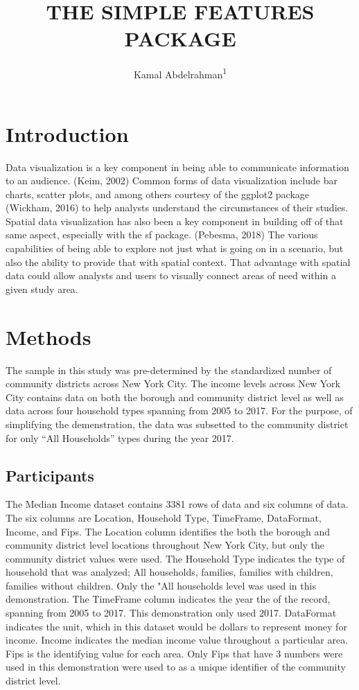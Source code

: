 \documentclass[man]{apa6}
\title{THE SIMPLE FEATURES PACKAGE}
\author{Kamal Abdelrahman\textsuperscript{1}}
\date{}
\affiliation{
\vspace{0.5cm}
\textsuperscript{1} City University of New York - Brooklyn College}
\begin{document}
\maketitle

\hypertarget{introduction}{%
\section{Introduction}\label{introduction}}

Data visualization is a key component in being able to communicate information to an audience. (Keim, 2002) Common forms of data visualization include bar charts, scatter plots, and among others courtesy of the ggplot2 package (Wickham, 2016) to help analysts understand the circumstances of their studies. Spatial data visualization has also been a key component in building off of that same aspect, especially with the sf package. (Pebesma, 2018) The various capabilities of being able to explore not just what is going on in a scenario, but also the ability to provide that with spatial context. That advantage with spatial data could allow analysts and users to visually connect areas of need within a given study area.

\hypertarget{methods}{%
\section{Methods}\label{methods}}

The sample in this study was pre-determined by the standardized number of community districts across New York City. The income levels across New York City contains data on both the borough and community district level as well as data across four household types spanning from 2005 to 2017. For the purpose, of simplifying the demenstration, the data was subsetted to the community district for only \enquote{All Households} types during the year 2017.

\hypertarget{participants}{%
\subsection{Participants}\label{participants}}

The Median Income dataset contains 3381 rows of data and six columns of data. The six columns are Location, Household Type, TimeFrame, DataFormat, Income, and Fips. The Location column identifies the both the borough and community district level locations throughout New York City, but only the community district values were used. The Household Type indicates the type of household that was analyzed; All households, families, families with children, families without children. Only the "All households level was used in this demonstration. The TimeFrame column indicates the year the of the record, spanning from 2005 to 2017. This demonstration only used 2017. DataFormat indicates the unit, which in this dataset would be dollars to represent money for income. Income indicates the median income value throughout a particular area. Fips is the identifying value for each area. Only Fips that have 3 numbers were used in this demonstration were used to as a unique identifier of the community district level.
\end{document}
